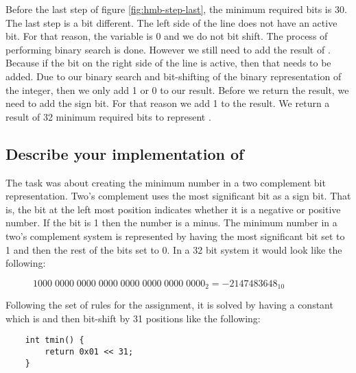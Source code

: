 Before the last step of figure \ref{fig:hmb-step-last}, the minimum required bits is 30. The last step is a bit different. The left side of the line does not have an active bit.
For that reason, the variable  is 0 and we do not bit shift.
The process of performing binary search is done. However we still need to add the result of . Because if the bit on the right side of the line is active, then that needs to be added.
Due to our binary search and bit-shifting of the binary representation of the integer, then we only add 1 or 0 to our result. 
Before we return the result, we need to add the sign bit. For that reason we add 1 to the result. We return a result of 32 minimum required bits to represent .

\subsection{Describe your implementation of }
The  task was about creating the minimum number in a two complement bit representation.
Two's complement uses the most significant bit as a sign bit. That is, the bit at the left most position indicates whether 
it is a negative or positive number. If the bit is 1 then the number is a minus. 
The minimum number in a two's complement system is represented by having the most significant bit set to 1 and then the rest of the bits set to 0.
In a 32 bit system it would look like the following:

\begin{figure}[h]
    $1000 \; 0000 \; 0000 \; 0000 \; 0000 \; 0000 \; 0000 \; 0000_2 = -2147483648_{10}$
    \centering
\end{figure}


Following the set of rules for the assignment, it is solved by having a constant which is 
and then bit-shift by 31 positions like the following:
\begin{lstlisting}
    int tmin() {
        return 0x01 << 31;
    }
\end{lstlisting}